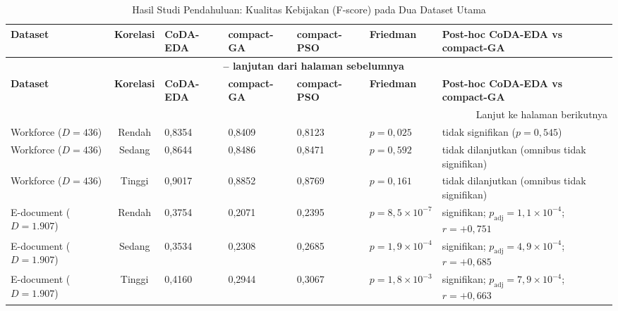\begin{longtable}{|p{2cm}|c|p{1.5cm}|p{1.5cm}|p{1.5cm}|>{\raggedright\arraybackslash}p{2cm}|>{\raggedright\arraybackslash}p{3cm}|}
\caption{Hasil Studi Pendahuluan: Kualitas Kebijakan (F-score) pada Dua Dataset Utama}
\label{tab:studi-pendahuluan-fscore} \\
\hline
\textbf{Dataset} & \textbf{Korelasi} & \textbf{CoDA-EDA} & \textbf{compact-GA} & \textbf{compact-PSO} & \textbf{Friedman} & \textbf{Post-hoc CoDA-EDA vs compact-GA} \\
\hline
\endfirsthead

\multicolumn{7}{c}{{\bfseries \tablename\ \thetable{} -- lanjutan dari halaman sebelumnya}} \\
\hline
\textbf{Dataset} & \textbf{Korelasi} & \textbf{CoDA-EDA} & \textbf{compact-GA} & \textbf{compact-PSO} & \textbf{Friedman} & \textbf{Post-hoc CoDA-EDA vs compact-GA} \\
\hline
\endhead

\hline
\multicolumn{7}{r}{Lanjut ke halaman berikutnya} \\
\endfoot

\hline
\endlastfoot

Workforce ($D=436$) & Rendah & 0{,}8354 & 0{,}8409 & 0{,}8123 & $p = 0{,}025$ & tidak signifikan ($p = 0{,}545$) \\
\hline
Workforce ($D=436$) & Sedang & 0{,}8644 & 0{,}8486 & 0{,}8471 & $p = 0{,}592$ & tidak dilanjutkan (omnibus tidak signifikan) \\
\hline
Workforce ($D=436$) & Tinggi & 0{,}9017 & 0{,}8852 & 0{,}8769 & $p = 0{,}161$ & tidak dilanjutkan (omnibus tidak signifikan) \\
\hline
E-document ($D=1.907$) & Rendah & 0{,}3754 & 0{,}2071 & 0{,}2395 & $p = 8{,}5 \times 10^{-7}$ & signifikan; $p_{\text{adj}} = 1{,}1 \times 10^{-4}$; $r = +0{,}751$\label{first:symbol-padj}\label{first:symbol-rr} \\
\hline
E-document ($D=1.907$) & Sedang & 0{,}3534 & 0{,}2308 & 0{,}2685 & $p = 1{,}9 \times 10^{-4}$ & signifikan; $p_{\text{adj}} = 4{,}9 \times 10^{-4}$; $r = +0{,}685$ \\
\hline
E-document ($D=1.907$) & Tinggi & 0{,}4160 & 0{,}2944 & 0{,}3067 & $p = 1{,}8 \times 10^{-3}$ & signifikan; $p_{\text{adj}} = 7{,}9 \times 10^{-4}$; $r = +0{,}663$ \\
\hline

\end{longtable}
\label{first:symbol-padj}

